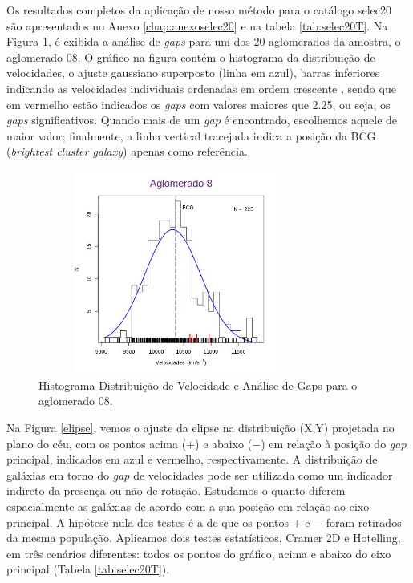 Os resultados completos da aplicação de nosso método para o catálogo selec20 são apresentados no Anexo \ref{chap:anexoselec20} e na tabela \ref{tab:selec20T}. Na Figura \ref{selec20gap}, é exibida a análise de \textit{gaps} para um dos 20 aglomerados da amostra, o aglomerado 08. O gráfico na figura contém o histograma da distribuição de velocidades, o ajuste gaussiano superposto (linha em azul), barras inferiores indicando as velocidades individuais ordenadas em ordem crescente , sendo que em vermelho estão indicados os \textit{gaps} com valores maiores que 2.25, ou seja, os \textit{gaps} significativos. Quando mais de um \textit{gap} é encontrado, escolhemos aquele de maior valor; finalmente, a linha vertical tracejada indica a posição da BCG (\textit{brightest cluster galaxy}) apenas como referência. 

\begin{figure}[H] %
\vspace{-2pt}
\begin{center}
\includegraphics[height=6.7cm,width=9cm]{04-figuras/selec20gap}%
\caption{Histograma Distribuição de Velocidade e Análise de Gaps para o aglomerado 08.}
\label{selec20gap}%
\end{center}
\end{figure}

Na Figura \ref{elipse}, vemos o ajuste da elipse na distribuição (X,Y) projetada no plano do céu, com os pontos acima ($+$) e abaixo ($-$) em relação à posição do \textit{gap} principal, indicados em azul e vermelho, respectivamente. A distribuição de galáxias em torno do \textit{gap} de velocidades pode ser utilizada como um indicador indireto da presença ou não de rotação. Estudamos o quanto diferem espacialmente as galáxias de acordo com a sua posição em relação ao eixo principal. A hipótese nula dos testes é a de que os pontos $+$ e $-$ foram retirados da mesma população. Aplicamos dois testes estatísticos, Cramer 2D e Hotelling, em três cenários diferentes: todos os pontos do gráfico, acima e abaixo do eixo principal (Tabela \ref{tab:selec20T}). 

